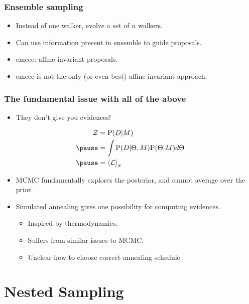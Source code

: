 \documentclass[%
]{beamer}
\newcommand{\lik}{\mathcal{L}}
\newcommand{\prior}{\pi}
\newcommand{\ev}{\mathcal{Z}}
\newcommand{\prob}{\mathrm{P}}
\begin{document}
\begin{frame}
  \frametitle{Ensemble sampling} 
  \begin{itemize}
      \pause\item Instead of one walker, evolve a set of $n$ walkers.
      \pause\item Can use information present in ensemble to guide proposals.
      \pause\item emcee: affine invariant proposals.
      \pause\item emcee is not the only (or even best) affine invariant approach.
  \end{itemize}
\end{frame}

\begin{frame}
  \frametitle{The fundamental issue with all of the above} 

  \begin{itemize}
    \item They don't give you evidences!
  \end{itemize}

  \begin{align}
    \ev 
    &= \prob(D|M) 
    \nonumber\\
    \pause&= \int\prob(D|\Theta,M)\prob(\Theta|M) d\Theta 
    \nonumber\\
    \pause&= \left\langle \lik \right\rangle_\prior
    \nonumber
  \end{align}
  
  \begin{itemize}
    \pause\item MCMC fundamentally explores the posterior, and cannot average over the prior.
    \pause\item Simulated annealing gives one possibility for computing evidences.
    \begin{itemize}
        \pause\item Inspired by thermodynamics.
        \pause\item Suffers from similar issues to MCMC.
        \pause\item Unclear how to choose correct annealing schedule
    \end{itemize}
  \end{itemize}
 
\end{frame}

\section{Nested Sampling}
\end{document}
